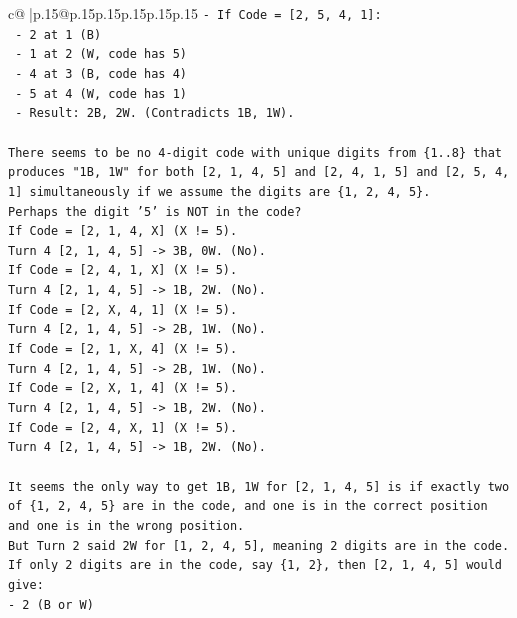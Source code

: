 \documentclass{article}
\begin{document}
{\begin{supertabular}{c@{$\;$}|p{.15\linewidth}@{}p{.15\linewidth}p{.15\linewidth}p{.15\linewidth}p{.15\linewidth}p{.15\linewidth}}
{{{\texttt{{-} If Code = {[}2, 5, 4, 1{]}:} \\
\texttt{  {-} 2 at 1 (B)} \\
\texttt{  {-} 1 at 2 (W, code has 5)} \\
\texttt{  {-} 4 at 3 (B, code has 4)} \\
\texttt{  {-} 5 at 4 (W, code has 1)} \\
\texttt{  {-} Result: 2B, 2W. (Contradicts 1B, 1W).} \\
\\ 
\texttt{There seems to be no 4{-}digit code with unique digits from \{1..8\} that produces "1B, 1W" for both {[}2, 1, 4, 5{]} and {[}2, 4, 1, 5{]} and {[}2, 5, 4, 1{]} simultaneously if we assume the digits are \{1, 2, 4, 5\}.} \\
\texttt{Perhaps the digit '5' is NOT in the code?} \\
\texttt{If Code = {[}2, 1, 4, X{]} (X != 5).} \\
\texttt{Turn 4 {[}2, 1, 4, 5{]} {-}> 3B, 0W. (No).} \\
\texttt{If Code = {[}2, 4, 1, X{]} (X != 5).} \\
\texttt{Turn 4 {[}2, 1, 4, 5{]} {-}> 1B, 2W. (No).} \\
\texttt{If Code = {[}2, X, 4, 1{]} (X != 5).} \\
\texttt{Turn 4 {[}2, 1, 4, 5{]} {-}> 2B, 1W. (No).} \\
\texttt{If Code = {[}2, 1, X, 4{]} (X != 5).} \\
\texttt{Turn 4 {[}2, 1, 4, 5{]} {-}> 2B, 1W. (No).} \\
\texttt{If Code = {[}2, X, 1, 4{]} (X != 5).} \\
\texttt{Turn 4 {[}2, 1, 4, 5{]} {-}> 1B, 2W. (No).} \\
\texttt{If Code = {[}2, 4, X, 1{]} (X != 5).} \\
\texttt{Turn 4 {[}2, 1, 4, 5{]} {-}> 1B, 2W. (No).} \\
\\ 
\texttt{It seems the only way to get 1B, 1W for {[}2, 1, 4, 5{]} is if exactly two of \{1, 2, 4, 5\} are in the code, and one is in the correct position and one is in the wrong position.} \\
\texttt{But Turn 2 said 2W for {[}1, 2, 4, 5{]}, meaning 2 digits are in the code.} \\
\texttt{If only 2 digits are in the code, say \{1, 2\}, then {[}2, 1, 4, 5{]} would give:} \\
\texttt{{-} 2 (B or W)} \\
}}}
\end{supertabular}}
\end{document}
